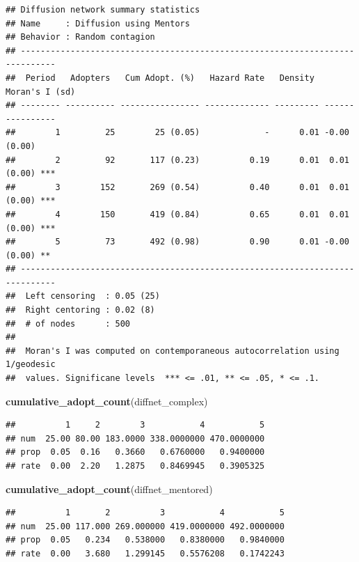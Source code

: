 \documentclass[
]{book}
\newenvironment{Shaded}{\begin{snugshade}}{\end{snugshade}}
\newcommand{\FunctionTok}[1]{\textcolor[rgb]{0.13,0.29,0.53}{\textbf{#1}}}
\newcommand{\NormalTok}[1]{#1}
\begin{document}
\begin{verbatim}
## Diffusion network summary statistics
## Name     : Diffusion using Mentors
## Behavior : Random contagion
## -----------------------------------------------------------------------------
##  Period   Adopters   Cum Adopt. (%)   Hazard Rate   Density   Moran's I (sd)  
## -------- ---------- ---------------- ------------- --------- ---------------- 
##        1         25        25 (0.05)             -      0.01 -0.00 (0.00)     
##        2         92       117 (0.23)          0.19      0.01  0.01 (0.00) *** 
##        3        152       269 (0.54)          0.40      0.01  0.01 (0.00) *** 
##        4        150       419 (0.84)          0.65      0.01  0.01 (0.00) *** 
##        5         73       492 (0.98)          0.90      0.01 -0.00 (0.00) **  
## -----------------------------------------------------------------------------
##  Left censoring  : 0.05 (25)
##  Right centoring : 0.02 (8)
##  # of nodes      : 500
## 
##  Moran's I was computed on contemporaneous autocorrelation using 1/geodesic
##  values. Significane levels  *** <= .01, ** <= .05, * <= .1.
\end{verbatim}

\begin{Shaded}
\begin{Highlighting}[]
\FunctionTok{cumulative\_adopt\_count}\NormalTok{(diffnet\_complex)}
\end{Highlighting}
\end{Shaded}

\begin{verbatim}
##          1     2        3           4           5
## num  25.00 80.00 183.0000 338.0000000 470.0000000
## prop  0.05  0.16   0.3660   0.6760000   0.9400000
## rate  0.00  2.20   1.2875   0.8469945   0.3905325
\end{verbatim}

\begin{Shaded}
\begin{Highlighting}[]
\FunctionTok{cumulative\_adopt\_count}\NormalTok{(diffnet\_mentored)}
\end{Highlighting}
\end{Shaded}

\begin{verbatim}
##          1       2          3           4           5
## num  25.00 117.000 269.000000 419.0000000 492.0000000
## prop  0.05   0.234   0.538000   0.8380000   0.9840000
## rate  0.00   3.680   1.299145   0.5576208   0.1742243
\end{verbatim}
\end{document}
